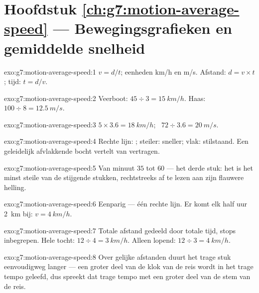\section*{Hoofdstuk \ref{ch:g7:motion-average-speed} --- Bewegingsgrafieken en gemiddelde snelheid}

\begin{solution}{exo:g7:motion-average-speed:1}
$v = d/t$; eenheden \unit{km/h} en \unit{m/s}. Afstand:
$d = v \times t$; tijd: $t = d/v$.
\end{solution}

\begin{solution}{exo:g7:motion-average-speed:2}
Veerboot: $45 \div 3 = \qty{15}{km/h}$. Haas: $100 \div 8 =
\qty{12.5}{m/s}$.
\end{solution}

\begin{solution}{exo:g7:motion-average-speed:3}
$5 \times 3.6 = \qty{18}{km/h}$; \ $72 \div 3.6 = \qty{20}{m/s}$.
\end{solution}

\begin{solution}{exo:g7:motion-average-speed:4}
Rechte lijn: ; steiler: sneller; vlak:
stilstaand. Een geleidelijk afvlakkende bocht vertelt van vertragen.
\end{solution}

\begin{solution}{exo:g7:motion-average-speed:5}
Van minuut $35$ tot $60$ --- het derde stuk: het is het minst steile
van de stijgende stukken, rechtstreeks af te lezen aan zijn flauwere
helling.
\end{solution}

\begin{solution}{exo:g7:motion-average-speed:6}
Eenparig --- één rechte lijn. Er komt elk half uur \qty{2}{km} bij:
$v = \qty{4}{km/h}$.
\end{solution}

\begin{solution}{exo:g7:motion-average-speed:7}
Totale afstand gedeeld door totale tijd, stops inbegrepen. Hele tocht:
$12 \div 4 = \qty{3}{km/h}$. Alleen lopend: $12 \div 3 =
\qty{4}{km/h}$.
\end{solution}

\begin{solution}{exo:g7:motion-average-speed:8}
Over gelijke afstanden duurt het trage stuk eenvoudigweg langer --- een
groter deel van de klok van de reis wordt in het trage tempo geleefd,
dus spreekt dat trage tempo met een groter deel van de stem van de
reis.
\end{solution}

